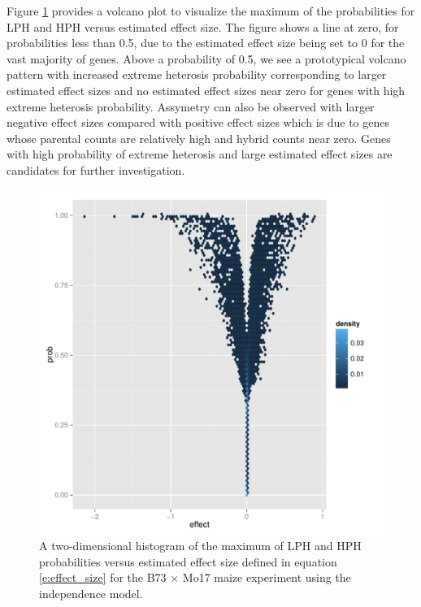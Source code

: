 \documentclass[useAMS,usenatbib,referee]{biom}
\begin{document}
Figure \ref{f:volcano} provides a volcano plot to visualize the maximum of the probabilities for LPH and HPH versus estimated effect size. The figure shows a line at zero, for probabilities less than 0.5, due to the estimated effect size being set to 0 for the vast majority of genes. Above a probability of 0.5, we see a prototypical volcano pattern with increased extreme heterosis probability corresponding to larger estimated effect sizes and no estimated effect sizes near zero for genes with high extreme heterosis probability. Assymetry can also be observed with larger negative effect sizes compared with positive effect sizes which is due to genes whose parental counts are relatively high and hybrid counts near zero. Genes with high probability of extreme heterosis and large estimated effect sizes are candidates for further investigation.


\begin{figure}
\centerline{\includegraphics[width=\textwidth]{volcano}}
\caption{A two-dimensional histogram of the maximum of LPH and HPH probabilities versus estimated effect size defined in equation \ref{e:effect_size} for the B73 $\times$ Mo17 maize experiment using the independence model.}
\label{f:volcano}
\end{figure}
\end{document}
